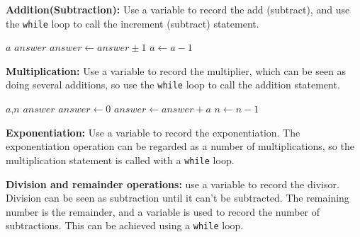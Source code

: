 \documentclass[11pt]{article}
\begin{document}
\newpage
{\bf Addition(Subtraction):} Use a variable to record the add (subtract), and use the \verb|while| loop to call the increment (subtract) statement.
\begin{algorithm}[!h]  
	\caption{Addition(Subtraction)}  
	\label{alg:Framwork}  
	\begin{algorithmic}  
		\Require  
		$a$
		\Ensure
		$answer$
			\State $answer\gets answer\pm 1$
			\State $a\gets a-1$
		\EndWhile
	\end{algorithmic}  
\end{algorithm}

{\bf Multiplication:} Use a variable to record the multiplier, which can be seen as doing several additions, so use the \verb|while| loop to call the addition statement.
\begin{algorithm}[!h]  
	\caption{Multiplication}  
	\label{alg:Framwork}  
	\begin{algorithmic}  
		\Require  
		$a$,$n$
		\Ensure
		$answer$
		\State $answer\gets 0$
			\State $answer\gets answer+a$
			\State $n\gets n-1$
		\EndWhile
	\end{algorithmic}  
\end{algorithm}

{\bf Exponentiation:} Use a variable to record the exponentiation. The exponentiation operation can be regarded as a number of multiplications, so the multiplication statement is called with a \verb|while| loop.

{\bf Division and remainder operations:} use a variable to record the divisor. Division can be seen as subtraction until it can't be subtracted. The remaining number is the remainder, and a variable is used to record the number of subtractions. This can be achieved using a \verb|while| loop.
\end{document}
